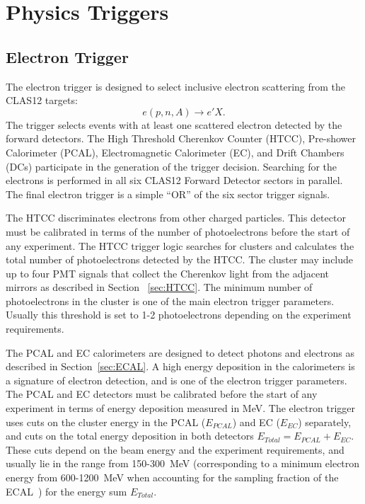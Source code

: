 \section{Physics Triggers}
\label{sec:physics_triggers}

\subsection{Electron Trigger}
\label{sec:electron_trigger}

The electron trigger is designed to select inclusive electron scattering from the CLAS12 targets:
\begin{equation}
e(p,n,A) \to e' X.
\label{eqn:electron}
\end{equation}
\noindent
The trigger selects events with at least one scattered electron detected by the forward detectors. The High
Threshold Cherenkov Counter (HTCC), Pre-shower Calorimeter (PCAL),  Electromagnetic Calorimeter (EC), and
Drift Chambers (DCs) participate in the generation of the trigger decision. Searching for the electrons is
performed in all six CLAS12 Forward Detector sectors in parallel. The final electron trigger is  a simple ``OR''
of the six sector trigger signals.

The HTCC discriminates electrons from other charged particles. This detector must be calibrated in terms of
the number of photoelectrons before the start of any experiment. The HTCC trigger logic  searches for clusters
and calculates the total number of  photoelectrons  detected by the HTCC. The cluster may include up to four
PMT signals that collect the Cherenkov light from the adjacent mirrors as described in Section ~\ref{sec:HTCC}.
The minimum number of  photoelectrons in the cluster  is one of the main electron trigger parameters. Usually
this threshold is set to 1-2 photoelectrons depending on the experiment requirements.

The PCAL and EC calorimeters are designed to detect photons and electrons as described in
Section~\ref{sec:ECAL}. A high energy deposition in the calorimeters is a signature of electron detection, and
is one of the electron trigger parameters. The PCAL and EC detectors must be calibrated before the start of
any experiment in terms of energy deposition measured in MeV. The electron trigger uses cuts on the cluster
energy in the PCAL ($E_{PCAL}$) and EC ($E_{EC}$) separately, and cuts on the total energy deposition in both
detectors $E_{Total}=E_{PCAL}+E_{EC}$. These cuts depend on the beam energy and the experiment requirements,
and usually lie in the range from 150-300~MeV (corresponding to a minimum electron energy from
600-1200~MeV when accounting for the sampling fraction of the ECAL~\cite{ec-ref}) for the energy sum
$E_{Total}$.

